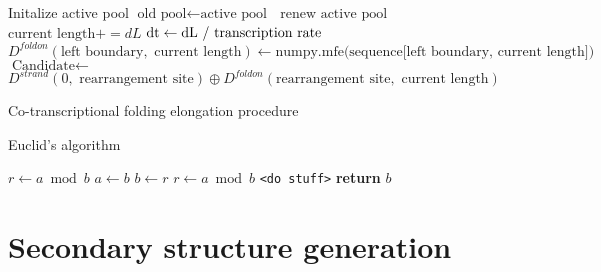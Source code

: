 \documentclass[11pt, a4paper]{article}
\begin{document}
\begin{algorithm}
  \begin{algorithmic}[1]
    \State Initalize active pool
      \State $\text{old pool} \gets \text{active pool }$
      \State $\text{renew active pool }$
      \State $\text{current length} += dL$
      \State $\text{dt} \gets \text{dL / \text{transcription rate}}$
        \State $D^{foldon}(\text{left boundary}, \text{ current length}) \gets \text{numpy.mfe(sequence[left boundary, current length]})$
      \EndFor
          \State $\text{Candidate} \gets$\\
          $D^{strand}(0, \text{ rearrangement site}) \oplus D^{foldon}(\text{rearrangement site}, \text{ current length})$
        \EndFor
      \EndFor
    \EndWhile
  \end{algorithmic}
\caption{Co-transcriptional folding elongation procedure}
\end{algorithm}

\begin{algorithm}
  \caption{Euclid’s algorithm}\label{euclid}
  \begin{algorithmic}[1]
      \State $r\gets a\bmod b$
        \State $a\gets b$
        \State $b\gets r$
        \State $r\gets a\bmod b$
      \EndWhile\label{euclidendwhile}
        \State \texttt{<do stuff>}
      \EndFor
      \State \textbf{return} $b$
    \EndProcedure
  \end{algorithmic}
\end{algorithm}

\section{Secondary structure generation}
\end{document}
